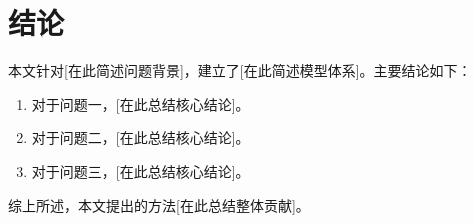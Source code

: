 \section{结论}


本文针对[在此简述问题背景]，建立了[在此简述模型体系]。主要结论如下：

\begin{enumerate}[label=\arabic*.,leftmargin=*]
  \item 对于问题一，[在此总结核心结论]。
  \item 对于问题二，[在此总结核心结论]。
  \item 对于问题三，[在此总结核心结论]。
\end{enumerate}

综上所述，本文提出的方法[在此总结整体贡献]。
